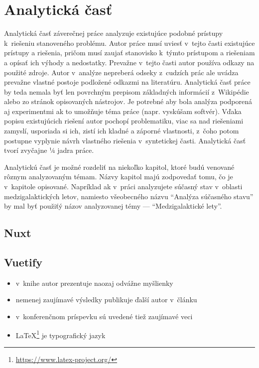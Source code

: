 
\chapter{Analytická časť}

Analytická časť záverečnej práce analyzuje existujúce podobné prístupy k~riešeniu stanoveného problému. Autor práce musí uviesť v~tejto časti existujúce prístupy a riešenia, pričom musí zaujať stanovisko k~týmto prístupom a riešeniam a opísať ich výhody a nedostatky. Prevažne v~tejto časti autor používa odkazy na použité zdroje. Autor v~analýze nepreberá odseky z~cudzích prác ale uvádza prevažne vlastné postoje podložené odkazmi na literatúru. Analytická časť práce by teda nemala byť len povrchným prepisom základných informácií z~Wikipédie alebo zo stránok opisovaných nástrojov. Je potrebné aby bola analýza podporená aj experimentmi ak to umožňuje téma práce (napr. vyskúšam softvér). Vďaka popisu existujúcich riešení autor pochopí problematiku, viac sa nad riešeniami zamyslí, usporiada si ich, zistí ich kladné a záporné vlastnosti, z~čoho potom postupne vyplynie návrh vlastného riešenia v~syntetickej časti. Analytická časť tvorí zvyčajne ¼ jadra práce.

Analytickú časť je možné rozdeliť na niekoľko kapitol, ktoré budú venované rôznym analyzovaným témam. Názvy kapitol majú zodpovedať tomu, čo je v~kapitole opisované. Napríklad ak v~práci analyzujete súčasný stav v~oblasti medzigalaktických letov, namiesto všeobecného názvu "`Analýza súčasného stavu"' by mal byť použiťý názov analyzovanej témy --- "`Medzigalaktické lety"'.

\section{Nuxt}


\section{Vuetify}
\begin{itemize}
    \item v~knihe \cite{book} autor prezentuje naozaj odvážne myšlienky
    \item nemenej zaujímavé výsledky publikuje ďalší autor v~článku \cite{article} 
    \item v~konferenčnom príspevku \cite{conference} sú uvedené tiež zaujímavé veci
    \item \LaTeX{}\footnote{\url{https://www.latex-project.org/}} je typografický jazyk
\end{itemize}

